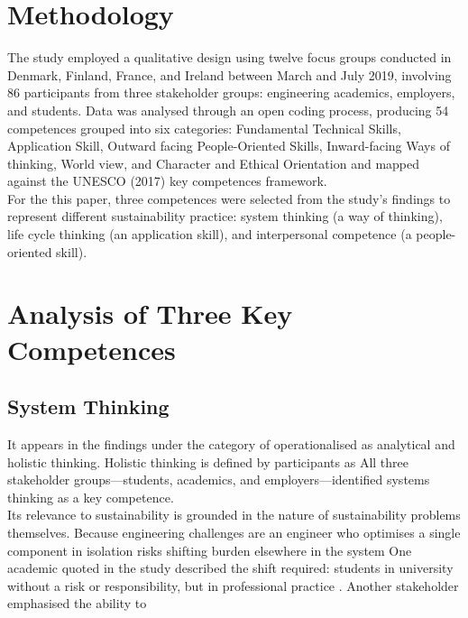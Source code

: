 \documentclass[11pt, a4paper]{article}
\begin{document}
\section{Methodology}
The study employed a qualitative design using twelve focus groups conducted in Denmark,
Finland, France, and Ireland between March and July 2019, involving 86 participants from three
stakeholder groups: engineering academics, employers, and students. Data was analysed through an open
coding process, producing 54 competences grouped into six categories: Fundamental Technical Skills,
Application Skill, Outward facing People-Oriented Skills, Inward-facing Ways of thinking, World view,
and Character and Ethical Orientation and mapped against the UNESCO (2017) key competences framework.
\\

For the this paper, three competences were selected from the study's findings to represent
different sustainability practice: system thinking (a way of thinking), life cycle thinking (an
application skill), and interpersonal competence (a people-oriented skill).

\newpage
\section{Analysis of Three Key Competences}
\subsection{System Thinking}
It appears in the findings under the category of 
operationalised as analytical and holistic thinking. Holistic thinking is defined by participants as
 All three stakeholder
groups---students, academics, and employers---identified systems thinking as a key competence.\\

Its relevance to sustainability is grounded in the nature of sustainability problems
themselves. Because engineering challenges are  an engineer who optimises a single component in isolation risks
shifting burden elsewhere in the system One academic quoted in the study described the shift required:
students in university  without a risk or responsibility, but in
professional practice . Another stakeholder emphasised the ability to
\\
\end{document}
